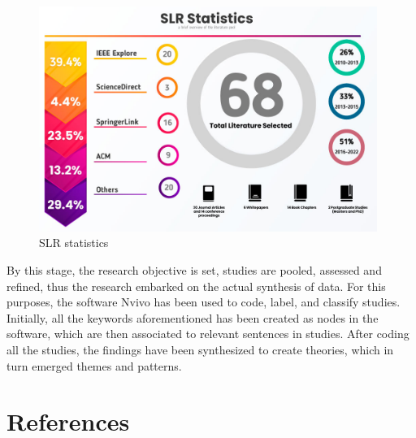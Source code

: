 \documentclass[review]{elsarticle}
\begin{document}
\begin{figure}[h!]
    \centering
    \includegraphics[width=11cm]{databases-statitistic.jpg}
    \caption{SLR statistics}
    \label{fig:SLRStats}
\end{figure}


By this stage, the research objective is set, studies are pooled, assessed and refined, thus the research embarked on the actual synthesis of data. For this purposes, the software Nvivo \cite{nvivo} has been used to code, label, and classify studies. Initially, all the keywords aforementioned has been created as nodes in the software, which are then associated to relevant sentences in studies. After coding all the studies, the findings have been synthesized to create theories, which in turn emerged themes and patterns. 





\section*{References}


\end{document}
